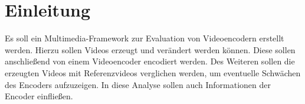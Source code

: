 ﻿\section{Einleitung}

Es soll ein Multimedia-Framework zur Evaluation von Videoencodern erstellt werden. Hierzu sollen Videos erzeugt und verändert werden können. Diese sollen anschließend von einem Videoencoder encodiert werden. Des Weiteren sollen die erzeugten Videos mit Referenzvideos verglichen werden, um eventuelle Schwächen des Encoders aufzuzeigen. In diese Analyse sollen auch Informationen der Encoder einfließen.